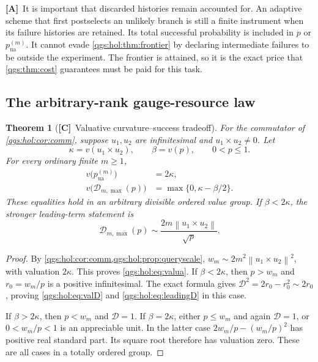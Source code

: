 \documentclass[11pt,oneside]{article}
\numberwithin{equation}{section}
\theoremstyle{plain}
\newtheorem{theorem}{Theorem}[section]
\theoremstyle{definition}
\theoremstyle{remark}
\newcommand{\TD}{\mathcal D}
\newcommand{\norm}[1]{\left\|#1\right\|}
\newcommand{\TC}{\textcolor{TierC}{\textsf{\bfseries[C]}}}
\newcommand{\TA}{\textcolor{TierA}{\textsf{\bfseries[A]}}}
\begin{document}
\TA\ It is important that discarded histories remain accounted for. An adaptive scheme that first postselects an unlikely branch is still a finite instrument when its failure histories are retained. Its total successful probability is included in $p$ or $p_{\mathrm{ua}}^{(m)}$. It cannot evade \cref{qgs:hol:thm:frontier} by declaring intermediate failures to be outside the experiment. The frontier is attained, so it is the exact price that \cref{qgs:thm:cost} guarantees must be paid for this task.

\subsection{The arbitrary-rank gauge-resource law}
\begin{theorem}[\TC\ Valuative curvature--success tradeoff]\label{qgs:hol:thm:valuation}
For the commutator of \cref{qgs:hol:cor:comm}, suppose $u_1,u_2$ are infinitesimal and $u_1\times u_2\neq0$. Let
\[
 \kappa=v(u_1\times u_2),\qquad \beta=v(p),\qquad 0<p\leq1.
\]
For every ordinary finite $m\geq1$,
\begin{align}
 v\bigl(p_{\mathrm{ua}}^{(m)}\bigr)&=2\kappa,\label{qgs:hol:eq:valua}\\
 v\bigl(\TD_{m,\max}(p)\bigr)&=
 \max\{0,\kappa-\beta/2\}.\label{qgs:hol:eq:valD}
\end{align}
These equalities hold in an arbitrary divisible ordered value group. If $\beta<2\kappa$, the stronger leading-term statement is
\begin{equation}\label{qgs:hol:eq:leadingD}
 \TD_{m,\max}(p)\sim \frac{2m\norm{u_1\times u_2}}{\sqrt p}.
\end{equation}
\end{theorem}
\begin{proof}
By \cref{qgs:hol:cor:comm,qgs:hol:prop:queryscale}, $w_m\sim2m^2\norm{u_1\times u_2}^2$, with valuation $2\kappa$. This proves \eqref{qgs:hol:eq:valua}. If $\beta<2\kappa$, then $p>w_m$ and $r_0=w_m/p$ is a positive infinitesimal. The exact formula gives $\TD^2=2r_0-r_0^2\sim2r_0$, proving \eqref{qgs:hol:eq:valD} and \eqref{qgs:hol:eq:leadingD} in this case.

If $\beta>2\kappa$, then $p<w_m$ and $\TD=1$. If $\beta=2\kappa$, either $p\leq w_m$ and again $\TD=1$, or $0<w_m/p<1$ is an appreciable unit. In the latter case $2w_m/p-(w_m/p)^2$ has positive real standard part. Its square root therefore has valuation zero. These are all cases in a totally ordered group.
\end{proof}
\end{document}

